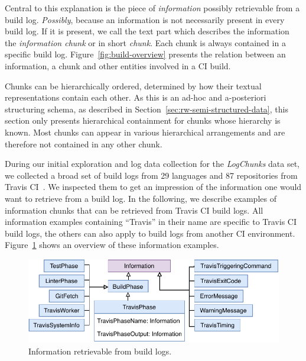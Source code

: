 \documentclass[\myrootdir/main.tex]{subfiles}
\begin{document}
Central to this explanation is the piece of \emph{information} possibly retrievable from a build log.
\emph{Possibly}, because an information is not necessarily present in every build log.
If it is present, we call the text part which describes the information the \emph{information chunk} or in short \emph{chunk}.
Each chunk is always contained in a specific build log.
Figure~\ref{fig:build-overview} presents the relation between an information, a chunk and other entities involved in a CI build.

Chunks can be hierarchically ordered, determined by how their textual representations contain each other.
As this is an ad-hoc and a-posteriori structuring schema, as described in Section~\ref{sec:rw-semi-structured-data}, this section only presents hierarchical containment for chunks whose hierarchy is known.
Most chunks can appear in various hierarchical arrangements and are therefore not contained in any other chunk.

During our initial exploration and log data collection for the \emph{LogChunks} data set, we collected a broad set of build logs from 29 languages and 87 repositories from Travis CI~\cite{travisci2019webpage}.
We inspected them to get an impression of the information one would want to retrieve from a build log.
In the following, we describe examples of information chunks that can be retrieved from Travis CI build logs.
All information examples containing ``Travis'' in their name are specific to Travis CI build logs, the others can also apply to build logs from another CI environment.
Figure~\ref{fig:build-log-information} shows an overview of these information examples.

\begin{figure}[htbp]
	\centering
	\includegraphics[width=\textwidth, clip]{img/build-log-information.pdf}
	\caption{Information retrievable from build logs.}
	\label{fig:build-log-information}
\end{figure}
\end{document}

